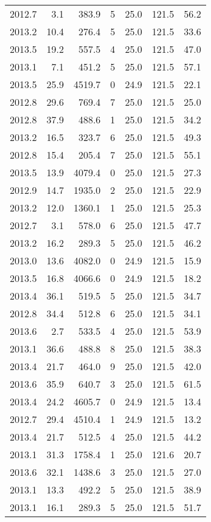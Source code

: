 \begin{tabular}{rrrrrrr}
2012.7 & 3.1 & 383.9 & 5 & 25.0 & 121.5 & 56.2 \\
2013.2 & 10.4 & 276.4 & 5 & 25.0 & 121.5 & 33.6 \\
2013.5 & 19.2 & 557.5 & 4 & 25.0 & 121.5 & 47.0 \\
2013.1 & 7.1 & 451.2 & 5 & 25.0 & 121.5 & 57.1 \\
2013.5 & 25.9 & 4519.7 & 0 & 24.9 & 121.5 & 22.1 \\
2012.8 & 29.6 & 769.4 & 7 & 25.0 & 121.5 & 25.0 \\
2012.8 & 37.9 & 488.6 & 1 & 25.0 & 121.5 & 34.2 \\
2013.2 & 16.5 & 323.7 & 6 & 25.0 & 121.5 & 49.3 \\
2012.8 & 15.4 & 205.4 & 7 & 25.0 & 121.5 & 55.1 \\
2013.5 & 13.9 & 4079.4 & 0 & 25.0 & 121.5 & 27.3 \\
2012.9 & 14.7 & 1935.0 & 2 & 25.0 & 121.5 & 22.9 \\
2013.2 & 12.0 & 1360.1 & 1 & 25.0 & 121.5 & 25.3 \\
2012.7 & 3.1 & 578.0 & 6 & 25.0 & 121.5 & 47.7 \\
2013.2 & 16.2 & 289.3 & 5 & 25.0 & 121.5 & 46.2 \\
2013.0 & 13.6 & 4082.0 & 0 & 24.9 & 121.5 & 15.9 \\
2013.5 & 16.8 & 4066.6 & 0 & 24.9 & 121.5 & 18.2 \\
2013.4 & 36.1 & 519.5 & 5 & 25.0 & 121.5 & 34.7 \\
2012.8 & 34.4 & 512.8 & 6 & 25.0 & 121.5 & 34.1 \\
2013.6 & 2.7 & 533.5 & 4 & 25.0 & 121.5 & 53.9 \\
2013.1 & 36.6 & 488.8 & 8 & 25.0 & 121.5 & 38.3 \\
2013.4 & 21.7 & 464.0 & 9 & 25.0 & 121.5 & 42.0 \\
2013.6 & 35.9 & 640.7 & 3 & 25.0 & 121.5 & 61.5 \\
2013.4 & 24.2 & 4605.7 & 0 & 24.9 & 121.5 & 13.4 \\
2012.7 & 29.4 & 4510.4 & 1 & 24.9 & 121.5 & 13.2 \\
2013.4 & 21.7 & 512.5 & 4 & 25.0 & 121.5 & 44.2 \\
2013.1 & 31.3 & 1758.4 & 1 & 25.0 & 121.6 & 20.7 \\
2013.6 & 32.1 & 1438.6 & 3 & 25.0 & 121.5 & 27.0 \\
2013.1 & 13.3 & 492.2 & 5 & 25.0 & 121.5 & 38.9 \\
2013.1 & 16.1 & 289.3 & 5 & 25.0 & 121.5 & 51.7 \\

\end{tabular}
